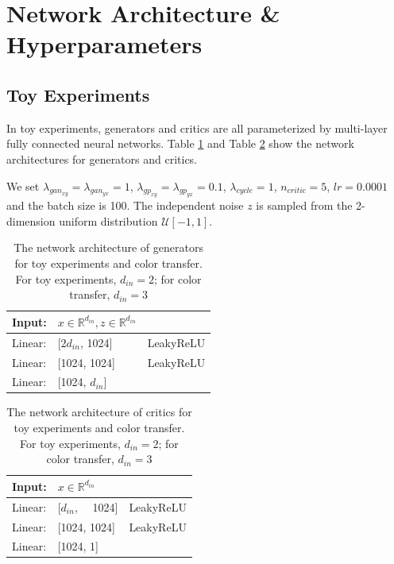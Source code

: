 \documentclass[runningheads]{llncs}
\begin{document}
\section{Network Architecture \& Hyperparameters}
\label{hyperparameters}

\subsection{Toy Experiments}
\label{hyperparameters_toy}
In toy experiments, generators and critics are all parameterized by multi-layer fully connected neural networks. Table \ref{toy_generator_generator} and Table \ref{toy_generator_critic} show the network architectures for generators and critics.

We set $\lambda_{gan_{xy}}=\lambda_{gan_{yx}}=1$, $\lambda_{gp_{xy}}=\lambda_{gp_{yx}}=0.1$, $\lambda_{cycle}=1$, $n_{critic}=5$, $lr=0.0001$ and the batch size is 100. The independent noise $z$ is sampled from the 2-dimension uniform distribution $\mathcal{U}[-1, 1]$. 

\begin{table}
	\vspace{-20pt}
	\centering
	\caption{The network architecture of generators for toy experiments and color transfer. For toy experiments, $d_{in}=2$; for color transfer, $d_{in}=3$}
	\vspace{3pt}
	\begin{tabular}{lll}
		\toprule[2pt]
		Input: & $x \in \mathbb{R}^{d_{in}}, z \in \mathbb{R}^{d_{in}}$ & \\
		\hline
		Linear: & [$2d_{in}$, 1024] & LeakyReLU \\
		\hline 
		Linear: & [1024, 1024] & LeakyReLU  \\
		\hline
		Linear: & [1024, $d_{in}$] \\
		\bottomrule[2pt]
	\end{tabular}
	\label{toy_generator_generator}
\end{table}

\begin{table}
	\vspace{-40pt}
	\centering
	\caption{The network architecture of critics for toy experiments and color transfer. For toy experiments, $d_{in}=2$; for color transfer, $d_{in}=3$}
	\vspace{3pt}
	\begin{tabular}{lll}
		\toprule[2pt]
		Input: & $x \in \mathbb{R}^{d_{in}}$ & \\
		\hline
		Linear: & [$d_{in}$, ~~1024] & LeakyReLU \\
		\hline 
		Linear: & [1024, 1024] & LeakyReLU  \\
		\hline
		Linear: & [1024, 1] \\
		\bottomrule[2pt]
	\end{tabular}
	\label{toy_generator_critic}
	\vspace{-10pt}
\end{table}
\end{document}
